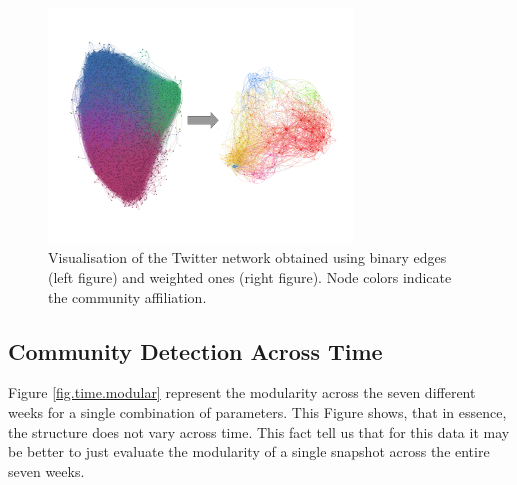 \documentclass[12pt]{article}
\begin{document}
\begin{figure}[!ht]
\centering
\includegraphics[width=0.72\textwidth]{Figures/twitter_data_networks.pdf}
\caption{Visualisation of the Twitter network obtained using binary edges (left figure) and weighted ones (right figure). Node colors indicate the
community affiliation.}
\label{networks_twitter}
\end{figure}

\subsection{Community Detection Across Time}

Figure \ref{fig.time.modular} represent the modularity across the
seven different weeks for a single combination of parameters. This Figure shows, that in essence, the
structure does not vary across time. This fact tell us that
for this data it may be better to just evaluate the modularity
of a single snapshot across the entire seven weeks. 
\end{document}
